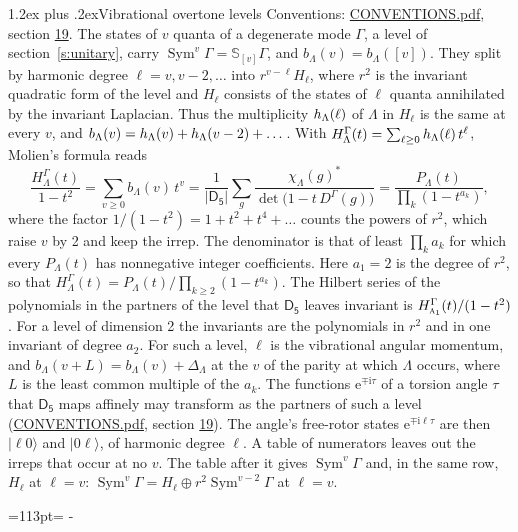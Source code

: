 \documentclass[10pt,a4paper]{article}
\makeatletter
\renewcommand\section{\@startsection{section}{1}{\z@}{-3ex plus -1ex minus -.2ex}%
  {1.2ex plus .2ex}{\normalfont\large\sffamily\bfseries\color{parttitle}}}
\newcommand{\needspace}[1]{\par\penalty-100\begingroup\dimen0=#1\relax\dimen2=\pagegoal
  \advance\dimen2-\pagetotal\ifdim\dimen0>\dimen2\relax\ifdim\dimen2>0pt\vfil\break\fi\fi
  \endgroup}
\numberwithin{equation}{section}
\newcommand{\grp}[1]{\mathsf{#1}}
\newcommand{\irr}[1]{\text{\normalfont\scshape #1}}
\newcommand{\iunit}{\mathrm{i}}
\newcommand{\expe}{\mathrm{e}}
\newcommand{\repD}[1]{D^{#1}}
\newcommand{\irchar}[1]{\chi_{#1}}
\newcommand{\conj}[1]{{#1}^{*}}
\newcommand{\schur}[1]{\mathbb{S}_{#1}}
\newcommand{\shape}[1]{[#1]}
\newcommand{\occ}[1]{\lvert #1\rangle}
\makeatother
\begin{document}
\section{Vibrational overtone levels}\label{s:overtones}
Conventions: \href{../../CONVENTIONS.pdf}{CONVENTIONS.pdf}, section \href{../../CONVENTIONS.pdf\#conv.19}{19}.
\leavevmode\label{n:index.quanta}\label{n:operator.symmetric.power}The states of $v$ quanta of a degenerate mode $\Gamma$, a level of section~\ref{s:unitary}, carry $\operatorname{Sym}^{v}\Gamma = \schur{\shape{v}}\Gamma$, and $b_\Lambda(v) = b_\Lambda(\shape{v})$. \label{n:local.quadratic.form}\label{n:set.harmonic}They split by harmonic degree $\ell = v, v - 2, \dots$ into $r^{v-\ell}H_\ell$, where $r^2$ is the invariant quadratic form of the level and $H_\ell$ consists of the states of $\ell$ quanta annihilated by the invariant Laplacian. \label{n:function.multiplicity.harmonic}Thus the multiplicity $\mathnormal{h}_\Lambda(\ell)$ of $\Lambda$ in $H_\ell$ is the same at every $v$, and $b_\Lambda(v) = \mathnormal{h}_\Lambda(v) + \mathnormal{h}_\Lambda(v - 2) + \dots$. \label{n:function.generating.level}With $H^{\Gamma}_\Lambda(t) = \sum_{\ell\ge0} \mathnormal{h}_\Lambda(\ell)\,t^{\ell}$, Molien's formula reads
\begin{equation}\label{e:molien}\frac{H^{\Gamma}_\Lambda(t)}{1 - t^2} = \sum_{v\ge0} b_\Lambda(v)\,t^v = \frac{1}{|\grp{D_{5}}|}\sum_{g}\frac{\conj{\irchar{\Lambda}(g)}}{\det\bigl(1 - t\,\repD{\Gamma}(g)\bigr)} = \frac{P_\Lambda(t)}{\prod_k (1-t^{a_k})},\end{equation}
where the factor $1/(1 - t^2) = 1 + t^2 + t^4 + \dots$ counts the powers of $r^2$, which raise $v$ by 2 and keep the irrep. The denominator is that of least $\prod_k a_k$ for which every $P_\Lambda(t)$ has nonnegative integer coefficients. Here $a_1 = 2$ is the degree of $r^2$, so that $H^{\Gamma}_\Lambda(t) = P_\Lambda(t)/\prod_{k\ge2}(1 - t^{a_k})$. The Hilbert series of the polynomials in the partners of the level that $\grp{D_{5}}$ leaves invariant is $H^{\Gamma}_{\irr{a}_{1}}(t)/(1 - t^2)$. For a level of dimension 2 the invariants are the polynomials in $r^2$ and in one invariant of degree $a_2$. \label{n:index.overtone.period}\label{n:index.increment.unitary}For such a level, $\ell$ is the vibrational angular momentum, and $b_\Lambda(v + L) = b_\Lambda(v) + \Delta_\Lambda$ at the $v$ of the parity at which $\Lambda$ occurs, where $L$ is the least common multiple of the $a_k$. \label{n:local.torsion.angle}The functions $\expe^{\mp\iunit\tau}$ of a torsion angle $\tau$ that $\grp{D_{5}}$ maps affinely may transform as the partners of such a level (\href{../../CONVENTIONS.pdf}{CONVENTIONS.pdf}, section \href{../../CONVENTIONS.pdf\#conv.19}{19}). The angle's free-rotor states $\expe^{\mp\iunit\ell\tau}$ are then $\occ{\ell 0}$ and $\occ{0 \ell}$, of harmonic degree $\ell$. A table of numerators leaves out the irreps that occur at no $v$. The table after it gives $\operatorname{Sym}^{v}\Gamma$ and, in the same row, $H_\ell$ at $\ell = v$: $\operatorname{Sym}^{v}\Gamma = H_\ell \oplus r^2\operatorname{Sym}^{v-2}\Gamma$ at $\ell = v$.
\needspace{113pt}
\end{document}
